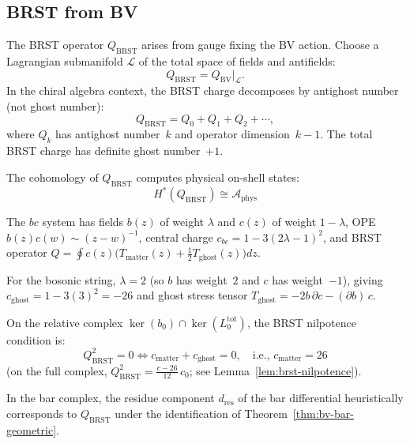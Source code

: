 \subsection{BRST from BV}

\begin{definition}
\label{def:brst-operator}
The BRST operator $Q_{\mathrm{BRST}}$ arises from gauge fixing the BV action.
Choose a Lagrangian submanifold $\mathcal{L}$ of the total space of fields and
antifields:
\[
Q_{\mathrm{BRST}} = Q_{\mathrm{BV}}\big|_{\mathcal{L}}.
\]
In the chiral algebra context, the BRST charge decomposes by antighost number
(not ghost number):
\[
Q_{\mathrm{BRST}} = Q_0 + Q_1 + Q_2 + \cdots,
\]
where $Q_k$ has antighost number~$k$ and operator dimension~$k-1$.
The total BRST charge has definite ghost number~$+1$.
\end{definition}

\begin{theorem}[BRST cohomology = physical states; \ClaimStatusProvedElsewhere{} \cite{CG17}]
\label{thm:brst-physical-states}
The cohomology of $Q_{\text{BRST}}$ computes physical on-shell states:
\[H^*(Q_{\text{BRST}}) \cong \mathcal{A}_{\text{phys}}\]
\end{theorem}

\begin{example}
The $bc$ system has fields $b(z)$ of weight $\lambda$ and $c(z)$ of weight $1-\lambda$, OPE $b(z)c(w) \sim (z-w)^{-1}$, central charge $c_{bc} = 1 - 3(2\lambda - 1)^2$, and BRST operator $Q = \oint c(z) \bigl(T_{\text{matter}}(z) + \tfrac{1}{2}T_{\text{ghost}}(z)\bigr) dz$.

For the bosonic string, $\lambda = 2$ (so $b$ has weight~$2$ and $c$ has weight~$-1$), giving $c_{\text{ghost}} = 1 - 3(3)^2 = -26$ and ghost stress tensor $T_{\text{ghost}} = -2b\,\partial c - (\partial b)\,c$.

On the relative complex $\ker(b_0) \cap \ker(L_0^{\mathrm{tot}})$,
the BRST nilpotence condition is:
\[
Q_{\mathrm{BRST}}^2 = 0
\iff c_{\mathrm{matter}} + c_{\mathrm{ghost}} = 0,
\quad\text{i.e., } c_{\mathrm{matter}} = 26
\]
(on the full complex, $Q_{\mathrm{BRST}}^2 = \tfrac{c-26}{12}\,c_0$;
see Lemma~\ref{lem:brst-nilpotence}).

In the bar complex, the residue component $d_{\mathrm{res}}$
of the bar differential heuristically corresponds to $Q_{\mathrm{BRST}}$
under the identification of Theorem~\ref{thm:bv-bar-geometric}.
\end{example}

